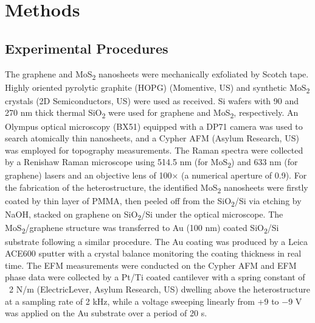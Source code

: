 \section{Methods}
\label{sec:asym-methods}

\subsection*{Experimental Procedures}
\label{sec:asym-exper-proc}

The graphene and MoS\textsubscript{2} nanosheets were mechanically
exfoliated by Scotch tape. Highly oriented pyrolytic graphite (HOPG)
(Momentive, US) and synthetic MoS\textsubscript{2} crystals (2D
Semiconductors, US) were used as received. Si wafers with 90 and 270
nm thick thermal SiO\textsubscript{2} were used for graphene and
MoS\textsubscript{2}, respectively. An Olympus optical microscopy
(BX51) equipped with a DP71 camera was used to search atomically thin
nanosheets, and a Cypher AFM (Asylum Research, US) was employed for
topography measurements. The Raman spectra were collected by a
Renishaw Raman microscope using 514.5 nm (for MoS\textsubscript{2})
and 633 nm (for graphene) lasers and an objective lens of 100× (a
numerical aperture of 0.9). For the fabrication of the
heterostructure, the identified MoS\textsubscript{2} nanosheets were
firstly coated by thin layer of PMMA, then peeled off from the
SiO\textsubscript{2}/Si via etching by NaOH, stacked on graphene on
SiO\textsubscript{2}/Si under the optical microscope. The
MoS\textsubscript{2}/graphene structure was transferred to Au (100 nm)
coated SiO\textsubscript{2}/Si substrate following a similar
procedure. The Au coating was produced by a Leica ACE600 sputter with
a crystal balance monitoring the coating thickness in real time. The
EFM measurements were conducted on the Cypher AFM and  EFM phase data
were collected by a Pt/Ti coated cantilever with a spring constant of
~2 N/m (ElectricLever, Asylum Research, US) dwelling above the
heterostructure at a sampling rate of 2 kHz, while a voltage sweeping
linearly from +9 to −9 V was applied on the Au substrate over a period
of 20 s.

